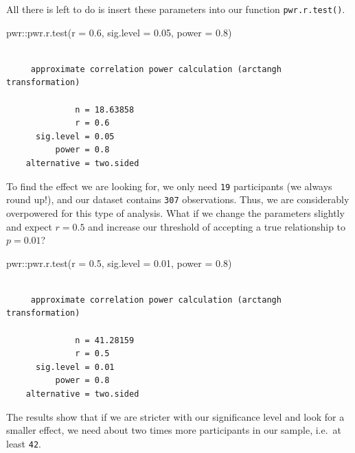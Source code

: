 \documentclass[
  letterpaper,
]{krantz}
\makeatletter
\newenvironment{Shaded}{\begin{snugshade}}{\end{snugshade}}
\newcommand{\AttributeTok}[1]{\textcolor[rgb]{0.40,0.45,0.13}{#1}}
\newcommand{\FloatTok}[1]{\textcolor[rgb]{0.68,0.00,0.00}{#1}}
\newcommand{\FunctionTok}[1]{\textcolor[rgb]{0.28,0.35,0.67}{#1}}
\newcommand{\NormalTok}[1]{\textcolor[rgb]{0.00,0.23,0.31}{#1}}
\newcommand{\SpecialCharTok}[1]{\textcolor[rgb]{0.37,0.37,0.37}{#1}}
\newenvironment{kframe}{%
\medskip{}
\setlength{\fboxsep}{.8em}
 \def\at@end@of@kframe{}%
 \ifinner\ifhmode%
  \def\at@end@of@kframe{\end{minipage}}%
  \begin{minipage}{\columnwidth}%
 \fi\fi%
 \def\FrameCommand##1{\hskip\@totalleftmargin \hskip-\fboxsep
 \colorbox{shadecolor}{##1}\hskip-\fboxsep
     \hskip-\linewidth \hskip-\@totalleftmargin \hskip\columnwidth}%
 \MakeFramed {\advance\hsize-\width
   \@totalleftmargin\z@ \linewidth\hsize
   \@setminipage}}%
 {\par\unskip\endMakeFramed%
 \at@end@of@kframe}
\renewenvironment{Shaded}{\begin{kframe}}{\end{kframe}}
\makeatother
\begin{document}
All there is left to do is insert these parameters into our function
\texttt{pwr.r.test()}.

\begin{Shaded}
\begin{Highlighting}[]
\NormalTok{pwr}\SpecialCharTok{::}\FunctionTok{pwr.r.test}\NormalTok{(}\AttributeTok{r =} \FloatTok{0.6}\NormalTok{,}
                \AttributeTok{sig.level =} \FloatTok{0.05}\NormalTok{,}
                \AttributeTok{power =} \FloatTok{0.8}\NormalTok{)}
\end{Highlighting}
\end{Shaded}

\begin{verbatim}

     approximate correlation power calculation (arctangh transformation) 

              n = 18.63858
              r = 0.6
      sig.level = 0.05
          power = 0.8
    alternative = two.sided
\end{verbatim}

To find the effect we are looking for, we only need \texttt{19}
participants (we always round up!), and our dataset contains
\texttt{307} observations. Thus, we are considerably overpowered for
this type of analysis. What if we change the parameters slightly and
expect \(r = 0.5\) and increase our threshold of accepting a true
relationship to \(p = 0.01\)?

\begin{Shaded}
\begin{Highlighting}[]
\NormalTok{pwr}\SpecialCharTok{::}\FunctionTok{pwr.r.test}\NormalTok{(}\AttributeTok{r =} \FloatTok{0.5}\NormalTok{,}
                \AttributeTok{sig.level =} \FloatTok{0.01}\NormalTok{,}
                \AttributeTok{power =} \FloatTok{0.8}\NormalTok{)}
\end{Highlighting}
\end{Shaded}

\begin{verbatim}

     approximate correlation power calculation (arctangh transformation) 

              n = 41.28159
              r = 0.5
      sig.level = 0.01
          power = 0.8
    alternative = two.sided
\end{verbatim}

The results show that if we are stricter with our significance level and
look for a smaller effect, we need about two times more participants in
our sample, i.e.~at least \texttt{42}.
\end{document}
